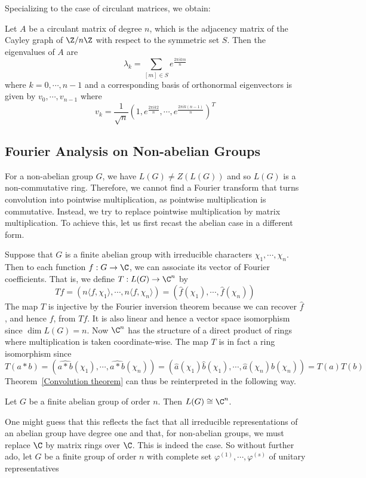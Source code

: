 Specializing to the case of circulant matrices, we obtain:
\begin{corollary}
Let $A$ be a circulant matrix of degree $n$, which is the adjacency matrix of the Cayley graph of $\Z/n\Z$ with respect to the symmetric set $S$. Then the
eigenvalues of $A$ are
\[\lambda_k=\sum_{[m]\in S}e^{\frac{2\pi ikm}{n}}\]
where $k=0,\cdots,n-1$ and a corresponding basis of orthonormal eigenvectors is given by $v_0,\cdots,v_{n-1}$ where
\[v_k=\frac{1}{\sqrt{n}}(1,e^{\frac{2\pi ik 2}{n}},\cdots,e^{\frac{2\pi ik (n-1)}{n}})^T\]
\end{corollary}
\subsection{Fourier Analysis on Non-abelian Groups}
For a non-abelian group $G$, we have $L(G)\neq Z(L(G))$ and so $L(G)$ is a
non-commutative ring. Therefore, we cannot find a Fourier transform that turns
convolution into pointwise multiplication, as pointwise multiplication is commutative. Instead, we try to replace pointwise multiplication by matrix multiplication. To achieve this, let us first recast the abelian case in a different form.\par
Suppose that $G$ is a finite abelian group with irreducible characters $\chi_1,\cdots,\chi_n$. Then to each function $f:G\to\C$, we can associate its vector of Fourier coefficients. That is, we define $T:L(G)\to\C^n$ by
\[Tf=(n\langle f,\chi_1\rangle,\cdots,n\langle f,\chi_n\rangle)=(\widehat{f}(\chi_1),\cdots,\widehat{f}(\chi_n))\]
The map $T$ is injective by the Fourier inversion theorem because we can recover $\widehat{f}$, and hence $f$, from $Tf$. It is also linear and hence a vector space isomorphism since $\dim L(G)=n$. Now $\C^n$ has the structure of a direct product of rings where multiplication is taken coordinate-wise. The map $T$ is in fact a ring isomorphism since
\[T(a\ast b)=(\widehat{a\ast b}(\chi_1),\cdots,\widehat{a\ast b}(\chi_n))=(\widehat{a}(\chi_1)\widehat{b}(\chi_1),\cdots,\widehat{a}(\chi_n)\widehat{b}(\chi_n))=T(a)T(b)\]
Theorem~\ref{Convolution theorem} can thus be reinterpreted in the following way.
\begin{theorem}
Let $G$ be a finite abelian group of order $n$. Then $L(G)\cong\C^n$.
\end{theorem}
One might guess that this reflects the fact that all irreducible representations of an abelian group have degree one and that, for non-abelian groups, we must replace $\C$ by matrix rings over $\C$. This is indeed the case. So without further ado, let $G$ be a finite group of order $n$ with complete set $\varphi^{(1)},\cdots,\varphi^{(s)}$ of unitary representatives
